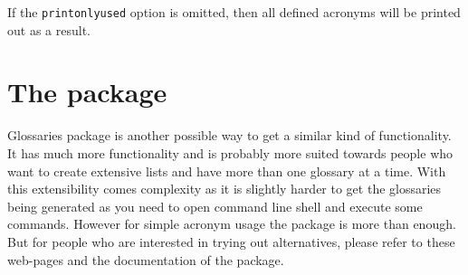 \documentclass[
]{scrartcl}
\begin{document}
%
If the \verb|printonlyused| option is omitted, then all defined acronyms will be
    printed out as a result.

\section{The  package}

%
Glossaries package is another possible way to get a similar kind of
    functionality.
%
It has much more functionality and is probably more suited towards people who
    want to create extensive lists and have more than one glossary at a time.
%
With this extensibility comes complexity as it is slightly harder to get the
    glossaries being generated as you need to open command line shell and
    execute some commands.
%
However for simple acronym usage the  package is more than enough.
%
But for people who are interested in trying out alternatives, please refer
    to these web-pages and the documentation of the package.
\end{document}
